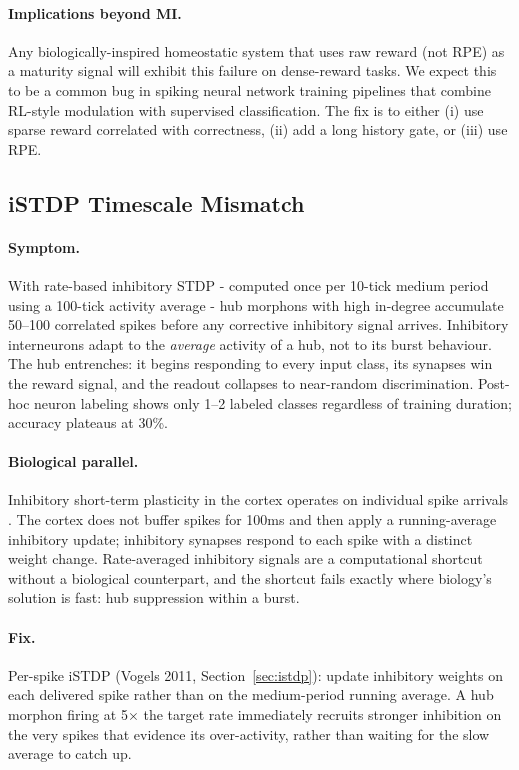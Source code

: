 \paragraph{Implications beyond MI.}
Any biologically-inspired homeostatic system that uses raw reward (not RPE) as a maturity signal will exhibit this failure on dense-reward tasks. We expect this to be a common bug in spiking neural network training pipelines that combine RL-style modulation with supervised classification. The fix is to either (i) use sparse reward correlated with correctness, (ii) add a long history gate, or (iii) use RPE.

\subsection{iSTDP Timescale Mismatch}
\label{sec:istdp_timescale}

\paragraph{Symptom.}
With rate-based inhibitory STDP - computed once per 10-tick medium period using a 100-tick activity average - hub morphons with high in-degree accumulate 50--100 correlated spikes before any corrective inhibitory signal arrives. Inhibitory interneurons adapt to the \emph{average} activity of a hub, not to its burst behaviour. The hub entrenches: it begins responding to every input class, its synapses win the reward signal, and the readout collapses to near-random discrimination. Post-hoc neuron labeling shows only 1--2 labeled classes regardless of training duration; accuracy plateaus at 30\%.

\paragraph{Biological parallel.}
Inhibitory short-term plasticity in the cortex operates on individual spike arrivals \citep{vogels2011inhibitory}. The cortex does not buffer spikes for 100ms and then apply a running-average inhibitory update; inhibitory synapses respond to each spike with a distinct weight change. Rate-averaged inhibitory signals are a computational shortcut without a biological counterpart, and the shortcut fails exactly where biology's solution is fast: hub suppression within a burst.

\paragraph{Fix.}
Per-spike iSTDP (Vogels 2011, Section~\ref{sec:istdp}): update inhibitory weights on each delivered spike rather than on the medium-period running average. A hub morphon firing at 5$\times$ the target rate immediately recruits stronger inhibition on the very spikes that evidence its over-activity, rather than waiting for the slow average to catch up.

